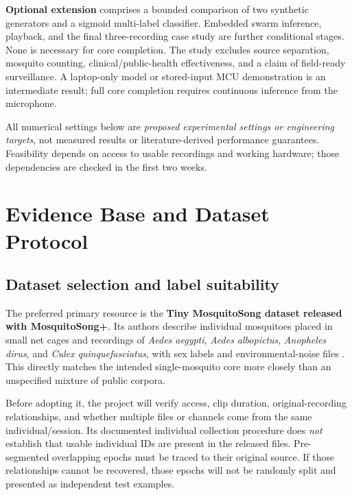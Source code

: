 \documentclass[a4paper,11pt]{article}
\newcommand{\advanced}{\textbf{Optional extension}}
\begin{document}
\advanced{} comprises a bounded comparison of two synthetic generators and a sigmoid multi-label classifier. Embedded swarm inference, playback, and the final three-recording case study are further conditional stages. None is necessary for core completion. The study excludes source separation, mosquito counting, clinical/public-health effectiveness, and a claim of field-ready surveillance. A laptop-only model or stored-input MCU demonstration is an intermediate result; full core completion requires continuous inference from the microphone.

All numerical settings below are \emph{proposed experimental settings or engineering targets}, not measured results or literature-derived performance guarantees. Feasibility depends on access to usable recordings and working hardware; those dependencies are checked in the first two weeks.

\section{Evidence Base and Dataset Protocol}
\subsection{Dataset selection and label suitability}
The preferred primary resource is the \textbf{Tiny MosquitoSong dataset released with MosquitoSong+}. Its authors describe individual mosquitoes placed in small net cages and recordings of \textit{Aedes aegypti}, \textit{Aedes albopictus}, \textit{Anopheles dirus}, and \textit{Culex quinquefasciatus}, with sex labels and environmental-noise files \cite{mosquitosongdata}. This directly matches the intended single-mosquito core more closely than an unspecified mixture of public corpora.

Before adopting it, the project will verify access, clip duration, original-recording relationships, and whether multiple files or channels come from the same individual/session. Its documented individual collection procedure does \emph{not} establish that usable individual IDs are present in the released files. Pre-segmented overlapping epochs must be traced to their original source. If those relationships cannot be recovered, those epochs will not be randomly split and presented as independent test examples.
\end{document}
